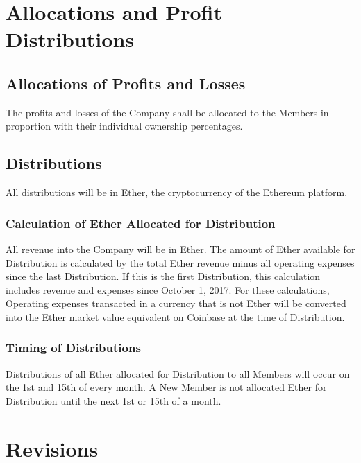 \documentclass[11pt]{article}
\begin{document}
\section{Allocations and Profit Distributions}

\subsection{Allocations of Profits and Losses}
The profits and losses of the Company shall be allocated to the Members in proportion with their individual ownership percentages.

\subsection{Distributions}
All distributions will be in Ether, the cryptocurrency of the Ethereum platform.

\subsubsection{Calculation of Ether Allocated for Distribution}
All revenue into the Company will be in Ether. The amount of Ether available for Distribution is calculated by the total Ether revenue minus all operating expenses since the last Distribution. If this is the first Distribution, this calculation includes revenue and expenses since October 1, 2017. For these calculations, Operating expenses transacted in a currency that is not Ether will be converted into the Ether market value equivalent on Coinbase at the time of Distribution.

\subsubsection{Timing of Distributions}
Distributions of all Ether allocated for Distribution to all Members will occur on the 1st and 15th of every month. A New Member is not allocated Ether for Distribution until the next 1st or 15th of a month.

\section{Revisions}

\vspace*{\fill}

\begin{flushright}

\pdfcreationdate
\end{flushright}
\end{document}
